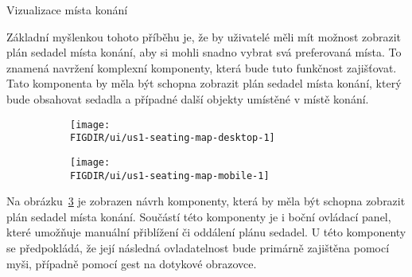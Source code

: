 \begin{subsection}{Vizualizace místa konání}
    \label{subsec:narvh-ui-transformace-uzivatelskych-pribehu-vizualizace-mista-konani}
    \userstoryvenuemap

    Základní myšlenkou tohoto příběhu je, že by uživatelé měli mít možnost zobrazit plán sedadel místa konání, aby si mohli snadno vybrat svá preferovaná místa.
    To znamená navržení komplexní komponenty, která bude tuto funkčnost zajišťovat.
    Tato komponenta by měla být schopna zobrazit plán sedadel místa konání, který bude obsahovat sedadla a případné další objekty umístěné v místě konání.

    \begin{figure}[H]
        \centering
        \caption{Návrh komponent pro vizualizaci plánu sedadel místa konání}
        \begin{subfigure}{0.775\textwidth}
            \texttt{[image: \\FIGDIR/ui/us1-seating-map-desktop-1]}
            \label{fig:us1-seating-map-desktop-1}
        \end{subfigure}
        \begin{subfigure}{0.2\textwidth}
            \texttt{[image: \\FIGDIR/ui/us1-seating-map-mobile-1]}
            \label{fig:us1-seating-map-mobile-1}
        \end{subfigure}
        \source
        \label{fig:us1-seating-map}
    \end{figure}

    Na obrázku~\ref{fig:us1-seating-map} je zobrazen návrh komponenty, která by měla být schopna zobrazit plán sedadel místa konání.
    Součástí této komponenty je i boční ovládací panel, které umožňuje manuální přiblížení či oddálení plánu sedadel.
    U této komponenty se předpokládá, že její následná ovladatelnost bude primárně zajištěna pomocí myši, případně pomocí gest na dotykové obrazovce.

\end{subsection}

